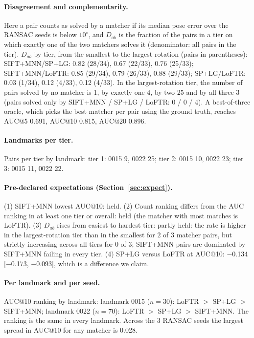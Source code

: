 \paragraph{Disagreement and complementarity.} Here a pair counts as solved by a matcher if its median pose error over the RANSAC seeds is below $10^\circ$, and $D_{ab}$ is the fraction of the pairs in a tier on which exactly one of the two matchers solves it (denominator: all pairs in the tier). $D_{ab}$ by tier, from the smallest to the largest rotation (pairs in parentheses): SIFT+MNN/SP+LG: 0.82 (28/34), 0.67 (22/33), 0.76 (25/33); SIFT+MNN/LoFTR: 0.85 (29/34), 0.79 (26/33), 0.88 (29/33); SP+LG/LoFTR: 0.03 (1/34), 0.12 (4/33), 0.12 (4/33). In the largest-rotation tier, the number of pairs solved by no matcher is 1, by exactly one 4, by two 25 and by all three 3 (pairs solved only by SIFT+MNN / SP+LG / LoFTR: 0 / 0 / 4). A best-of-three oracle, which picks the best matcher per pair using the ground truth, reaches AUC@5 0.691, AUC@10 0.815, AUC@20 0.896.

\paragraph{Landmarks per tier.} Pairs per tier by landmark: tier 1: 0015 9, 0022 25; tier 2: 0015 10, 0022 23; tier 3: 0015 11, 0022 22.

\paragraph{Pre-declared expectations (Section~\ref{sec:expect}).} (1) SIFT+MNN lowest AUC@10: held. (2) Count ranking differs from the AUC ranking in at least one tier or overall: held (the matcher with most matches is LoFTR). (3) $D_{ab}$ rises from easiest to hardest tier: partly held: the rate is higher in the largest-rotation tier than in the smallest for 2 of 3 matcher pairs, but strictly increasing across all tiers for 0 of 3; SIFT+MNN pairs are dominated by SIFT+MNN failing in every tier. (4) SP+LG versus LoFTR at AUC@10: $-$0.134 [$-$0.173, $-$0.093], which is a difference we claim.
\paragraph{Per landmark and per seed.} AUC@10 ranking by landmark: landmark 0015 ($n=30$): LoFTR $>$ SP+LG $>$ SIFT+MNN; landmark 0022 ($n=70$): LoFTR $>$ SP+LG $>$ SIFT+MNN. The ranking is the same in every landmark. Across the 3 RANSAC seeds the largest spread in AUC@10 for any matcher is 0.028.
